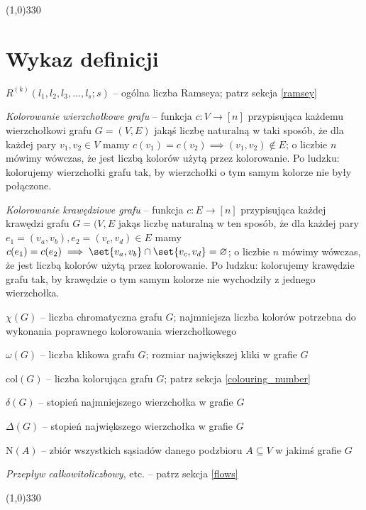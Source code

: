 \line(1,0){330} \\

\section*{Wykaz definicji}

\vspace{2pt}

\(R^{(k)}(l_1,l_2,l_3,\dots,l_s;s)\) -- ogólna liczba Ramseya; patrz sekcja \ref{ramsey}

\textit{Kolorowanie wierzchołkowe grafu} -- funkcja \(c: V \rightarrow [n]\) przypisująca każdemu wierzchołkowi grafu \(G = (V, E)\) jakąś liczbę naturalną w taki sposób, że dla każdej pary \(v_1, v_2 \in V\) mamy \(  c(v_1) = c(v_2) \implies (v_1, v_2) \not\in E\); o liczbie \(n\) mówimy wówczas, że jest liczbą kolorów użytą przez kolorowanie. Po ludzku: kolorujemy wierzchołki grafu tak, by wierzchołki o tym samym kolorze nie były połączone.

\textit{Kolorowanie krawędziowe grafu} -- funkcja \(c: E \rightarrow [n]\) przypisująca każdej krawędzi grafu \(G = (V,E\) jakąs liczbę naturalną w ten sposób, że dla każdej pary \(e_1 = (v_a, v_b), e_2 = (v_c, v_d) \in E\) mamy \(c(e_1) = c(e_2) \implies \set{v_a,v_b} \cap \set{v_c, v_d} = \varnothing \); o liczbie \(n\) mówimy wówczas, że jest liczbą kolorów użytą przez kolorowanie. Po ludzku: kolorujemy krawędzie grafu tak, by krawędzie o tym samym kolorze nie wychodziły z jednego wierzchołka.

\( \chi(G) \) -- liczba chromatyczna grafu \(G\); najmniejsza liczba kolorów potrzebna do wykonania poprawnego kolorowania wierzchołkowego

\(\omega(G)\) -- liczba klikowa grafu \(G\); rozmiar największej kliki w grafie \(G\)

\(\mathrm{col}(G)\) -- liczba kolorująca grafu \(G\); patrz sekcja \ref{colouring_number}

\(\delta(G)\) -- stopień najmniejszego wierzchołka w grafie \(G\)

\(\Delta(G)\) -- stopień największego wierzchołka w grafie \(G\)

\(\mathrm{N}(A)\) -- zbiór wszystkich sąsiadów danego podzbioru \( A \subseteq V\) w jakimś grafie \(G\)

\textit{Przepływ całkowitoliczbowy}, etc. -- patrz sekcja \ref{flows}

\vspace{2pt}

\line(1,0){330}
